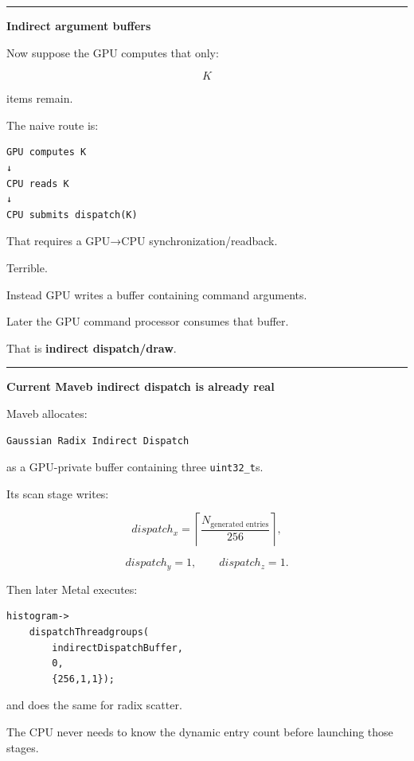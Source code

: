 \begin{center}\rule{0.5\linewidth}{0.5pt}\end{center}

\textbf{Indirect argument buffers}

Now suppose the GPU computes that only:

\[
K
\]

items remain.

The naive route is:

\protect{}\label{p10-bad-readback}%
\begin{verbatim}
GPU computes K
↓
CPU reads K
↓
CPU submits dispatch(K)
\end{verbatim}

That requires a GPU→CPU synchronization/readback.

Terrible.

Instead GPU writes a buffer containing command arguments.

Later the GPU command processor consumes that buffer.

That is \textbf{indirect dispatch/draw}.

\begin{center}\rule{0.5\linewidth}{0.5pt}\end{center}

\textbf{Current Maveb indirect dispatch is already real}

Maveb allocates:

\protect{}\label{p10-indirect-buffer}%
\begin{verbatim}
Gaussian Radix Indirect Dispatch
\end{verbatim}

as a GPU-private buffer containing three \texttt{uint32\_t}s.

Its scan stage writes:

\[
dispatch_x
=
\left\lceil
\frac{
N_{\text{generated entries}}
}{
256
}
\right\rceil,
\]

\[
dispatch_y=1,
\qquad
dispatch_z=1.
\]

Then later Metal executes:

\protect{}\label{p10-indirect-dispatch}%
\begin{verbatim}
histogram->
    dispatchThreadgroups(
        indirectDispatchBuffer,
        0,
        {256,1,1});
\end{verbatim}

and does the same for radix scatter.

The CPU never needs to know the dynamic entry count before launching those stages.

